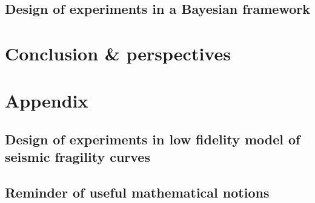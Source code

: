 \documentclass[a4paper]{book}
\renewcommand{\familydefault}{\sfdefault}
\begin{document}
\chapter{Design of experiments in a Bayesian framework}\label{chap:doe}






\part{Conclusion \& perspectives}\label{part:conclusion}


\appendix
\part*{Appendix}\label{part:appendix}


\chapter{Design of experiments in low fidelity model of seismic fragility curves}\label{app:chap:ESAIM}



\chapter{Reminder of useful mathematical notions}

 
 
\printbibliography 
{}

\newpage
\pagestyle{empty}
\backmatter
\ \cleardoublepage
\ \newpage
\renewcommand{\familydefault}{\sfdefault}


 
\end{document}
